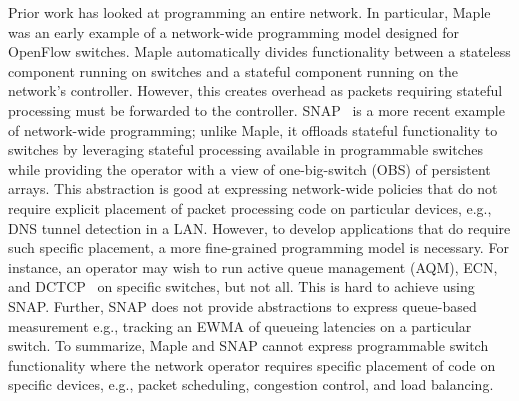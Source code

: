 Prior work has looked at programming an entire
network. In particular, Maple~\cite{maple} was an early example of a
network-wide programming model designed for OpenFlow switches. Maple
automatically divides functionality between a stateless component running on
switches and a stateful component running on the network's controller. However,
this creates overhead as packets requiring stateful processing
must be forwarded to the controller. SNAP~\cite{snap} is a more recent example of network-wide programming; unlike
Maple, it offloads stateful functionality to switches by
leveraging stateful processing available in programmable switches while providing the operator with a view of one-big-switch (OBS) of persistent arrays. 
This abstraction is good at expressing network-wide policies that do not require explicit placement of packet processing code on particular devices, e.g., DNS tunnel detection in a LAN. 
However, to develop applications that do require such specific placement, a more fine-grained programming model is necessary. For instance, an operator may wish to run active queue management (AQM), ECN, and DCTCP~\cite{dctcp} on specific switches, but not all. This is hard to achieve using SNAP. Further, SNAP does not provide abstractions to express queue-based measurement e.g., tracking an EWMA of queueing latencies on a particular switch. %
To summarize, Maple and SNAP cannot express programmable switch functionality where the network operator requires specific placement of code on specific devices, e.g., packet scheduling, congestion control, and load balancing. %

